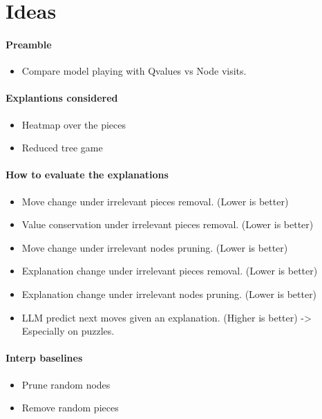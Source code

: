 \section{Ideas}

\paragraph{Preamble}
\begin{itemize}
    \item Compare model playing with Qvalues vs Node visits.
\end{itemize}


\paragraph{Explantions considered}
\begin{itemize}
    \item Heatmap over the pieces
    \item Reduced tree game
\end{itemize}

\paragraph{How to evaluate the explanations}
\begin{itemize}
    \item Move change under irrelevant pieces removal. (Lower is better)
    \item Value conservation under irrelevant pieces removal. (Lower is better)
    \item Move change under irrelevant nodes pruning. (Lower is better)
    \item Explanation change under irrelevant pieces removal. (Lower is better)
    \item Explanation change under irrelevant nodes pruning. (Lower is better)
    \item LLM predict next moves given an explanation. (Higher is better) -> Especially on puzzles.
\end{itemize}


\paragraph{Interp baselines}
\begin{itemize}
    \item Prune random nodes
    \item Remove random pieces
\end{itemize}

